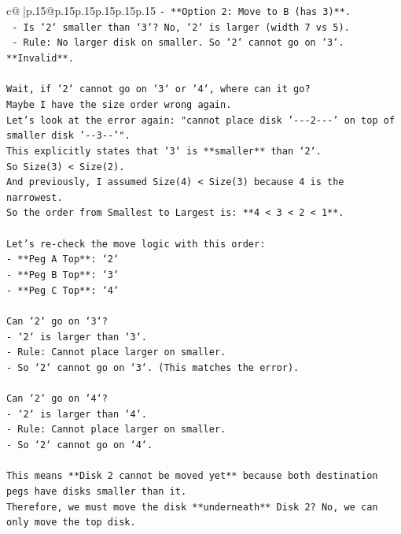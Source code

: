 \documentclass{article}
\begin{document}
{\begin{supertabular}{c@{$\;$}|p{.15\linewidth}@{}p{.15\linewidth}p{.15\linewidth}p{.15\linewidth}p{.15\linewidth}p{.15\linewidth}}
{{{\texttt{{-} **Option 2: Move to B (has 3)**.} \\
\texttt{  {-} Is `2` smaller than `3`? No, `2` is larger (width 7 vs 5).} \\
\texttt{  {-} Rule: No larger disk on smaller. So `2` cannot go on `3`. **Invalid**.} \\
\\ 
\texttt{Wait, if `2` cannot go on `3` or `4`, where can it go?} \\
\texttt{Maybe I have the size order wrong again.} \\
\texttt{Let's look at the error again: "cannot place disk '{-}{-}{-}2{-}{-}{-}' on top of smaller disk '{-}{-}3{-}{-}'".} \\
\texttt{This explicitly states that `3` is **smaller** than `2`.} \\
\texttt{So Size(3) < Size(2).} \\
\texttt{And previously, I assumed Size(4) < Size(3) because 4 is the narrowest.} \\
\texttt{So the order from Smallest to Largest is: **4 < 3 < 2 < 1**.} \\
\\ 
\texttt{Let's re{-}check the move logic with this order:} \\
\texttt{{-} **Peg A Top**: `2`} \\
\texttt{{-} **Peg B Top**: `3`} \\
\texttt{{-} **Peg C Top**: `4`} \\
\\ 
\texttt{Can `2` go on `3`?} \\
\texttt{{-} `2` is larger than `3`.} \\
\texttt{{-} Rule: Cannot place larger on smaller.} \\
\texttt{{-} So `2` cannot go on `3`. (This matches the error).} \\
\\ 
\texttt{Can `2` go on `4`?} \\
\texttt{{-} `2` is larger than `4`.} \\
\texttt{{-} Rule: Cannot place larger on smaller.} \\
\texttt{{-} So `2` cannot go on `4`.} \\
\\ 
\texttt{This means **Disk 2 cannot be moved yet** because both destination pegs have disks smaller than it.} \\
\texttt{Therefore, we must move the disk **underneath** Disk 2? No, we can only move the top disk.} \\
}}}
\end{supertabular}}
\end{document}
